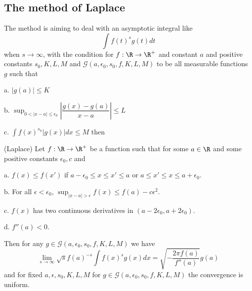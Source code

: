 \chapter{}

\section{The method of Laplace}

The method is aiming to deal with an asymptotic integral like
\[\int f(t)^{s}g(t)dt\]
when $s\to \infty$, with the condition for $f:\R\to\R^+$ and constant $a$ and positive constants $s_0,K,L,M$ and $\mathcal{G}(a,\epsilon_0,s_0,f,K,L,M)$ to be all measurable functions $g$ such that\par
a. $|g(a)| \leq K$\par
b. $\sup_{0<|x-a|\leq\epsilon_0} \left|\dfrac{g(x)-g(a)}{x-a}\right| \leq L$\par
c. $\int f(x)^{s_0}|g(x)|dx \leq M$ then

\begin{theorem}
    (Laplace) Let $f:\R \to \R^+$ be a function such that for some $a\in \R$ and some positive constants $\epsilon_0,c$ and\par
    a. $f(x)\leq f(x')$ if $a-\epsilon_0 \leq x \leq x' \leq a$ or $a\leq x'\leq x\leq a+\epsilon_0$.\par
    b. For all $\epsilon < \epsilon_0$, $\sup_{|x-a|>\epsilon}f(x) \leq f(a) - c\epsilon^2$.\par
    c. $f(x)$ has two continuous derivatives in $(a-2\epsilon_0,a+2\epsilon_0)$.\par
    d. $f''(a) < 0$.\par
    Then for any $g\in \mathcal{G}(a,\epsilon_0,s_0,f,K,L,M) $ we have
    \[
    \lim_{s\to \infty}\sqrt{s}f(a)^{-s}\int f(x)^sg(x)dx = \sqrt{-\dfrac{2\pi f(a)}{f''(a)}}g(a)
    \]
    and for fixed $a,\epsilon,s_0,K,L,M$ for $g\in \mathcal{G}(a,\epsilon_0,s_0,f,K,L,M)$ the convergence is uniform.
\end{theorem}

